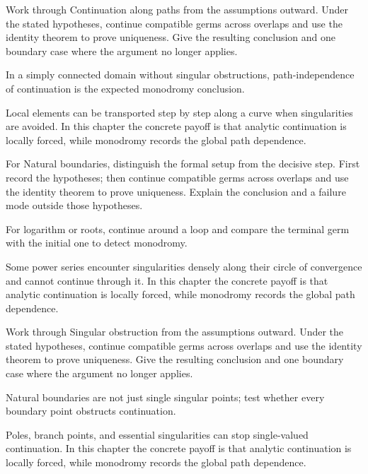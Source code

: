 \begin{exercise}\label{exr:iv15-05}
Work through Continuation along paths from the assumptions outward. Under the stated hypotheses, continue compatible germs across overlaps and use the identity theorem to prove uniqueness. Give the resulting conclusion and one boundary case where the argument no longer applies.
\end{exercise}
\begin{hint}
In a simply connected domain without singular obstructions, path-independence of continuation is the expected monodromy conclusion.
\end{hint}
\begin{solution}
Local elements can be transported step by step along a curve when singularities are avoided. In this chapter the concrete payoff is that analytic continuation is locally forced, while monodromy records the global path dependence.
\end{solution}

\begin{exercise}\label{exr:iv15-06}
For Natural boundaries, distinguish the formal setup from the decisive step. First record the hypotheses; then continue compatible germs across overlaps and use the identity theorem to prove uniqueness. Explain the conclusion and a failure mode outside those hypotheses.
\end{exercise}
\begin{hint}
For logarithm or roots, continue around a loop and compare the terminal germ with the initial one to detect monodromy.
\end{hint}
\begin{solution}
Some power series encounter singularities densely along their circle of convergence and cannot continue through it. In this chapter the concrete payoff is that analytic continuation is locally forced, while monodromy records the global path dependence.
\end{solution}

\begin{exercise}\label{exr:iv15-07}
Work through Singular obstruction from the assumptions outward. Under the stated hypotheses, continue compatible germs across overlaps and use the identity theorem to prove uniqueness. Give the resulting conclusion and one boundary case where the argument no longer applies.
\end{exercise}
\begin{hint}
Natural boundaries are not just single singular points; test whether every boundary point obstructs continuation.
\end{hint}
\begin{solution}
Poles, branch points, and essential singularities can stop single-valued continuation. In this chapter the concrete payoff is that analytic continuation is locally forced, while monodromy records the global path dependence.
\end{solution}

